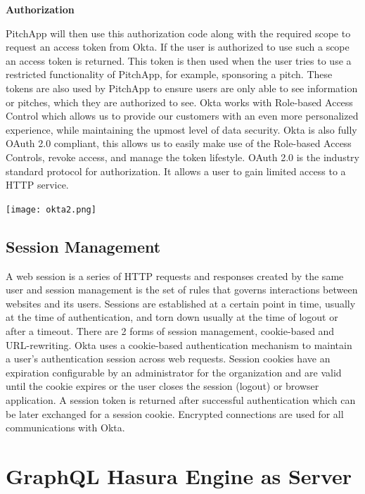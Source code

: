 \textbf{Authorization}

PitchApp will then use this authorization code along with the required scope to request an access token from Okta. If the user is authorized to use such a scope an access token is returned. This token is then used when the user tries to use a restricted functionality of PitchApp, for example, sponsoring a pitch. These tokens are also used by PitchApp to ensure users are only able to see information or pitches, which they are authorized to see.
Okta works with Role-based Access Control which allows us to provide our customers with an even more personalized experience, while maintaining the upmost level of data security. Okta is also fully OAuth 2.0 compliant, this allows us to easily make use of the Role-based Access Controls, revoke access, and manage the token lifestyle. OAuth 2.0 is the industry standard protocol for authorization. It allows a user to gain limited access to a HTTP service.

\begin{center}
	\texttt{[image: okta2.png]}
\end{center}

\subsection{Session Management}

A web session is a series of HTTP requests and responses created by the same user and session management is the set of rules that governs interactions between websites and its users. Sessions are established at a certain point in time, usually at the time of authentication, and torn down usually at the time of logout or after a timeout. There are 2 forms of session management, cookie-based and URL-rewriting.
Okta uses a cookie-based authentication mechanism to maintain a user's authentication session across web requests. Session cookies have an expiration configurable by an administrator for the organization and are valid until the cookie expires or the user closes the session (logout) or browser application. A session token is returned after successful authentication which can be later exchanged for a session cookie. Encrypted connections are used for all communications with Okta.

\pagebreak

\section{GraphQL Hasura Engine as Server}

